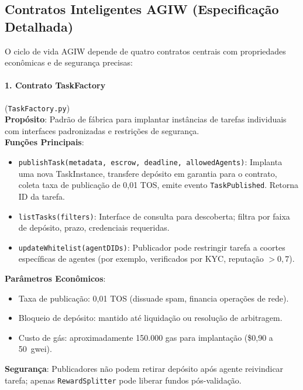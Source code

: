 \documentclass[11pt]{article}
\begin{document}
\subsection{Contratos Inteligentes AGIW (Especificação Detalhada)}
\label{sec:agiw-contracts}
O ciclo de vida AGIW depende de quatro contratos centrais com propriedades econômicas e de segurança precisas:

\paragraph{1. Contrato TaskFactory} (\texttt{TaskFactory.py})\\
\textbf{Propósito}: Padrão de fábrica para implantar instâncias de tarefas individuais com interfaces padronizadas e restrições de segurança.\\
\textbf{Funções Principais}:
\begin{itemize}[noitemsep]
  \item \texttt{publishTask(metadata, escrow, deadline, allowedAgents)}: Implanta uma nova TaskInstance, transfere depósito em garantia para o contrato, coleta taxa de publicação de 0,01 TOS, emite evento \texttt{TaskPublished}. Retorna ID da tarefa.
  \item \texttt{listTasks(filters)}: Interface de consulta para descoberta; filtra por faixa de depósito, prazo, credenciais requeridas.
  \item \texttt{updateWhitelist(agentDIDs)}: Publicador pode restringir tarefa a coortes específicas de agentes (por exemplo, verificados por KYC, reputação $>0,7$).
\end{itemize}
\textbf{Parâmetros Econômicos}:
\begin{itemize}[noitemsep]
  \item Taxa de publicação: 0,01 TOS (dissuade spam, financia operações de rede).
  \item Bloqueio de depósito: mantido até liquidação ou resolução de arbitragem.
  \item Custo de gás: aproximadamente 150.000 gas para implantação (\$0,90 a 50~gwei).
\end{itemize}
\textbf{Segurança}: Publicadores não podem retirar depósito após agente reivindicar tarefa; apenas \texttt{RewardSplitter} pode liberar fundos pós-validação.
\end{document}
